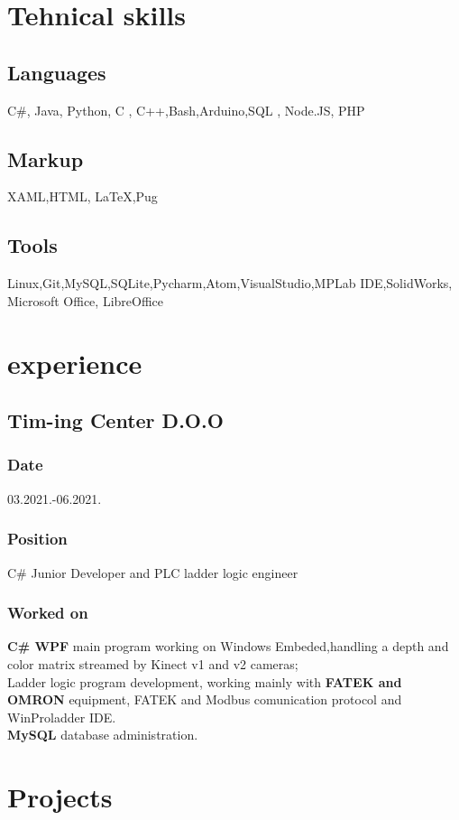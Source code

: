 \documentclass[10pt]{article}
\begin{document}
\section{Tehnical skills}
\subsection{Languages}
C\#, Java, Python, C , C++,Bash,Arduino,SQL , Node.JS, PHP
\subsection{Markup}
XAML,HTML, \LaTeX,Pug
\subsection{Tools}
Linux,Git,MySQL,SQLite,Pycharm,Atom,VisualStudio,MPLab IDE,SolidWorks, Microsoft Office, LibreOffice

\section{experience}
\subsection{\large{Tim-ing Center D.O.O}}
\subsubsection{Date}
03.2021.-06.2021.
\subsubsection{Position}
C\# Junior Developer and PLC ladder logic engineer
\subsubsection{Worked on}
\textbf{C\# WPF} main program working on Windows Embeded,handling a depth and color matrix streamed by Kinect v1 and v2 cameras;\\
Ladder logic program development, working mainly with \textbf{FATEK and OMRON} equipment, FATEK and Modbus comunication protocol and WinProladder IDE.\\
\textbf{MySQL} database administration.\\


\section{Projects}
\end{document}
